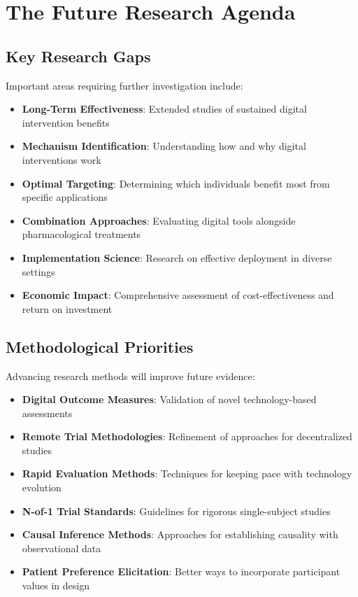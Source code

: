 \section{The Future Research Agenda}
\subsection{Key Research Gaps}
Important areas requiring further investigation include:

\begin{itemize}
    \item \textbf{Long-Term Effectiveness}: Extended studies of sustained digital intervention benefits
    
    \item \textbf{Mechanism Identification}: Understanding how and why digital interventions work
    
    \item \textbf{Optimal Targeting}: Determining which individuals benefit most from specific applications
    
    \item \textbf{Combination Approaches}: Evaluating digital tools alongside pharmacological treatments
    
    \item \textbf{Implementation Science}: Research on effective deployment in diverse settings
    
    \item \textbf{Economic Impact}: Comprehensive assessment of cost-effectiveness and return on investment
\end{itemize}

\subsection{Methodological Priorities}
Advancing research methods will improve future evidence:

\begin{itemize}
    \item \textbf{Digital Outcome Measures}: Validation of novel technology-based assessments
    
    \item \textbf{Remote Trial Methodologies}: Refinement of approaches for decentralized studies
    
    \item \textbf{Rapid Evaluation Methods}: Techniques for keeping pace with technology evolution
    
    \item \textbf{N-of-1 Trial Standards}: Guidelines for rigorous single-subject studies
    
    \item \textbf{Causal Inference Methods}: Approaches for establishing causality with observational data
    
    \item \textbf{Patient Preference Elicitation}: Better ways to incorporate participant values in design
\end{itemize}

